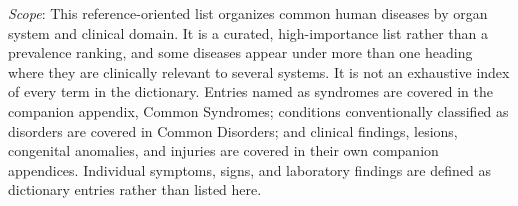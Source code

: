 \small
\noindent\textit{Scope}: This reference-oriented list organizes common human diseases by organ system and clinical domain. It is a curated, high-importance list rather than a prevalence ranking, and some diseases appear under more than one heading where they are clinically relevant to several systems. It is not an exhaustive index of every term in the dictionary. Entries named as syndromes are covered in the companion appendix, Common Syndromes; conditions conventionally classified as disorders are covered in Common Disorders; and clinical findings, lesions, congenital anomalies, and injuries are covered in their own companion appendices. Individual symptoms, signs, and laboratory findings are defined as dictionary entries rather than listed here.

